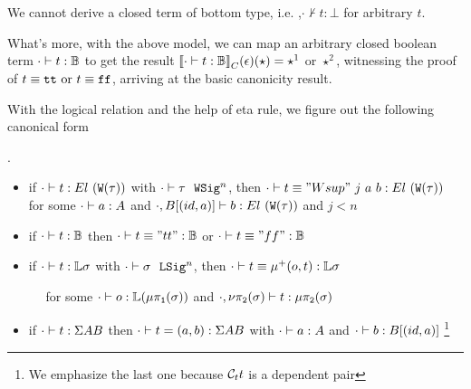 \begin{theorem}[Consistency]
  We cannot derive a closed term of bottom type, i.e. ,$\cdot \not \vdash t : \bot$ for arbitrary $t$.
\end{theorem}

What's more, with the above model, we can map an arbitrary closed boolean term $ {\cdot} \vdash {t} : {\mathbb{B}} $ to get the result ${\llbracket {\ensuremath{ {\cdot} \vdash {t} : {\mathbb{B}} }} \rrbracket}_C(\epsilon)(\star) = \star^1$ or $\star^2$, witnessing the proof of $t \equiv \texttt{tt} \text{ or } t \equiv\texttt{ff}$, arriving at the basic canonicity result.


With the logical relation and the help of eta rule, we figure out the following canonical form
\begin{theorem}.
  \begin{itemize}
    \item if $ {\cdot} \vdash {t} : {El~(\texttt{W}({\tau}))} $ with $ {\cdot} \vdash {\tau} \ \ \texttt{WSig}^{n} $, then $ {\cdot} \vdash {t \equiv "Wsup"~j~a~b} : {El~(\texttt{W}({\tau}))} $ for some $ {\cdot} \vdash {a} : {A} $ and $ {\cdot, B[(id, a)]} \vdash {b} : {El~(\texttt{W}({\tau}))} $ and $j < n$
    \item if $ {\cdot} \vdash {t} : {\mathbb{B}} $ then $ {\cdot} \vdash {t \equiv "tt"} : {\mathbb{B}} $ or $ {\cdot} \vdash {t \equiv "ff"} : {\mathbb{B}} $ 
    \item if $ {\cdot} \vdash {t} : {\mathbb{L}\sigma} $ with $ {\cdot} \vdash {\sigma} \ \ \texttt{LSig}^{n} $, then $ {\cdot} \vdash {t \equiv \ensuremath{\mu^+({o},{t})}} : {\mathbb{L}\sigma} $ 
    
      $\quad$ for some $ {\cdot} \vdash {o} : {\mathbb{L}(\mu\pi_{\texttt{1}}({\sigma}))} $ and $ {\cdot, \nu\pi_{\texttt{2}}({\sigma})} \vdash {t} : {\mu\pi_{\texttt{2}}({\sigma})} $
    \item if $ {\cdot} \vdash {t} : {\Sigma A B} $ then $ {\cdot} \vdash {t = (a, b)} : {\Sigma A B} $ with $ {\cdot} \vdash {a} : {A} $ and $ {\cdot} \vdash {b} : {B[(id, a)]} $
    \footnote{We emphasize the last one because $\mathcal{C}_t t$ is a dependent pair}
  \end{itemize}
\end{theorem}

